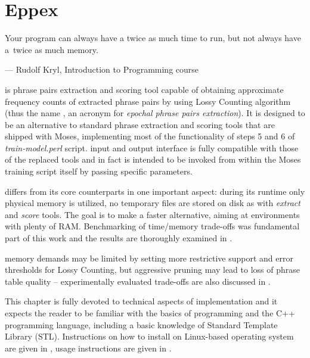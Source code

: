 
\chapter{Eppex}
\label{chap:eppex}

\setlength{\epigraphwidth}{1.0\textwidth}
\epigraph{Your program can always have a twice as much time to run, but not always have a~twice as much memory.}{--- Rudolf Kryl, Introduction to Programming course}

\Eppex{} is phrase pairs extraction and scoring tool capable of obtaining approximate
frequency counts of extracted phrase pairs by using Lossy Counting algorithm
(thus the name \eppex{}, an acronym for \emph{epochal phrase pairs extraction}).
It is designed to be an alternative to standard phrase extraction and scoring tools that
are shipped with Moses, implementing most of the functionality of steps 5 and 6 of
\emph{train-model.perl} script.
\Eppex{} input and output interface is fully compatible with those of the replaced tools
and \eppex{} in fact is intended to be invoked from within the Moses training script itself
by passing specific parameters.

\Eppex{} differs from its core counterparts in one important aspect: during its runtime
only physical memory is utilized, no temporary files are stored on disk as with \emph{extract}
and \emph{score} tools.
The goal is to make \eppex{} a faster alternative, aiming at environments with plenty of RAM.
Benchmarking of time/memory trade-offs was fundamental part of this work and the results are
thoroughly examined in .

\Eppex{} memory demands may be limited by setting more restrictive support and error thresholds
for Lossy Counting, but aggressive pruning may lead to loss of phrase table quality --
experimentally evaluated trade-offs are also discussed in .

This chapter is fully devoted to technical aspects of implementation and it expects the reader
to be familiar with the basics of programming and the C++ programming language, including
a basic knowledge of Standard Template Library (STL).
Instructions on how to install \eppex{} on Linux-based operating system are given in
, usage instructions are given in .

